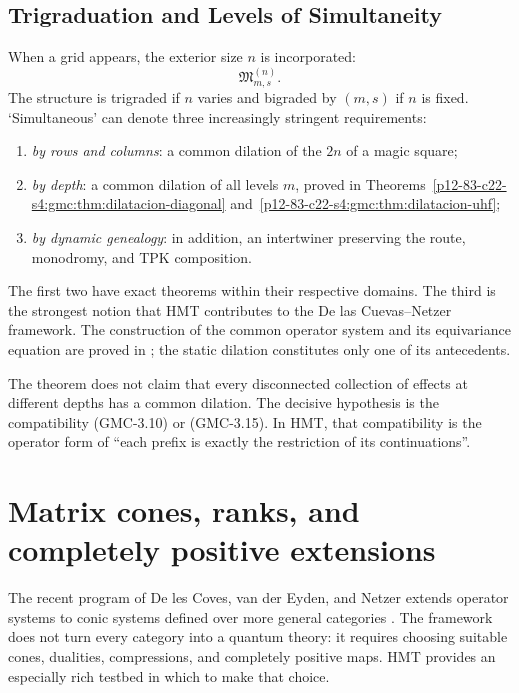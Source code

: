 \subsection{Trigraduation and Levels of Simultaneity}

When a grid appears, the exterior size $n$ is incorporated:
\[
 \mathfrak M_{m,s}^{(n)}.
 \tag{GMC-3.17}
\]
The structure is trigraded if $n$ varies and bigraded by $(m,s)$ if
$n$ is fixed. ‘Simultaneous’ can denote three increasingly stringent requirements:

\begin{enumerate}
 \item \emph{by rows and
columns}: a common dilation of the $2n$
\POVM of a magic square;
 \item \emph{by depth}: a common dilation of all levels
 $m$, proved in Theorems~\ref{p12-83-c22-s4:gmc:thm:dilatacion-diagonal}
 and~\ref{p12-83-c22-s4:gmc:thm:dilatacion-uhf};
 \item \emph{by dynamic genealogy}: in addition, an intertwiner preserving
 the route, monodromy, and TPK composition.
\end{enumerate}

The first two have exact theorems within their respective domains. The third is the
strongest notion that HMT contributes to the De las Cuevas--Netzer framework. The
construction of the common operator system and its equivariance equation are
proved in ; the static dilation constitutes
only one of its antecedents.

\begin{controlbox}
The theorem does not claim that every disconnected collection of effects at different
depths has a common dilation. The decisive hypothesis is the
compatibility \textup{(GMC-3.10)} or \textup{(GMC-3.15)}. In HMT, that compatibility is the
operator form of “each prefix is exactly the restriction of its
continuations”.
\end{controlbox}


\section{Matrix cones, ranks, and completely positive extensions}
\label{p12-83-c22-s5:gmc:chap:beyond}

The recent program of De les Coves, van der Eyden, and Netzer extends
operator systems to conic systems defined over more general
categories \citep{delescoves2026beyond}. The framework does not turn every
category into a quantum theory: it requires choosing suitable cones, dualities, compressions, and
completely positive maps. HMT provides an especially
rich testbed in which to make that choice.

